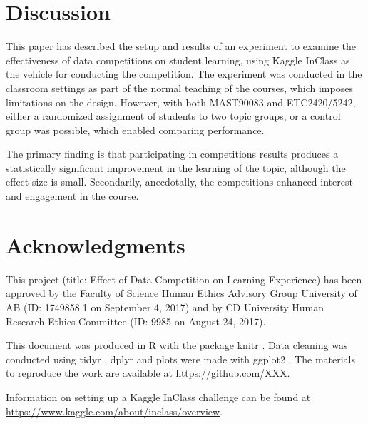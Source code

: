 \documentclass[12pt]{article}
\begin{document}
\section{Discussion}\label{discussion}

This paper has described the setup and results of an experiment to
examine the effectiveness of data competitions on student learning,
using Kaggle InClass as the vehicle for conducting the competition. The
experiment was conducted in the classroom settings as part of the normal
teaching of the courses, which imposes limitations on the design.
However, with both MAST90083 and ETC2420/5242, either a randomized
assignment of students to two topic groups, or a control group was
possible, which enabled comparing performance.

The primary finding is that participating in competitions results
produces a statistically significant improvement in the learning of the
topic, although the effect size is small. Secondarily, anecdotally, the
competitions enhanced interest and engagement in the course.

\section{Acknowledgments}\label{acknowledgments}

This project (title: Effect of Data Competition on Learning Experience)
has been approved by the Faculty of Science Human Ethics Advisory Group
University of AB (ID: 1749858.1 on September 4, 2017) and by CD
University Human Research Ethics Committee (ID: 9985 on August 24,
2017).

This document was produced in R \citep{R} with the package knitr
\citep{knitr}. Data cleaning was conducted using tidyr \citep{tidyr},
dplyr \citep{dplyr} and plots were made with ggplot2 \citep{ggplot2}.
The materials to reproduce the work are available at
\url{https://github.com/XXX}.

Information on setting up a Kaggle InClass challenge can be found at
\url{https://www.kaggle.com/about/inclass/overview}.



\end{document}
